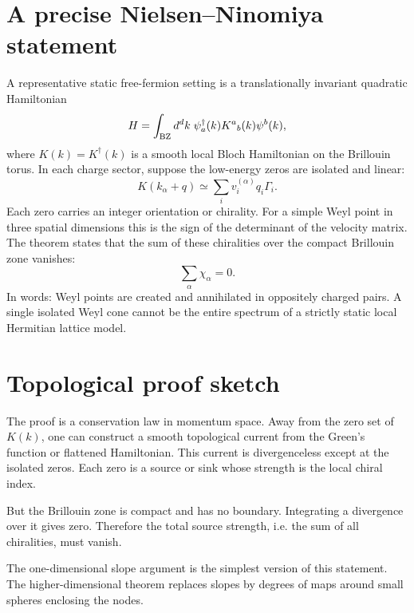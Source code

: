 \documentclass[11pt]{article}
\begin{document}
\section{A precise Nielsen--Ninomiya statement}
A representative static free-fermion setting is a translationally invariant quadratic Hamiltonian
\begin{equation}
  H=\int_{\rm BZ} d^d k\; \psi_a^\dagger(k)K^a{}_b(k)\psi^b(k),
\end{equation}
where $K(k)=K^\dagger(k)$ is a smooth local Bloch Hamiltonian on the Brillouin torus. In each charge sector, suppose the low-energy zeros are isolated and linear:
\begin{equation}
  K(k_\alpha+q)\simeq \sum_i v_i^{(\alpha)}q_i\Gamma_i.
\end{equation}
Each zero carries an integer orientation or chirality. For a simple Weyl point in three spatial dimensions this is the sign of the determinant of the velocity matrix. The theorem states that the sum of these chiralities over the compact Brillouin zone vanishes:
\begin{equation}
  \sum_\alpha \chi_\alpha=0.
\end{equation}
In words: Weyl points are created and annihilated in oppositely charged pairs. A single isolated Weyl cone cannot be the entire spectrum of a strictly static local Hermitian lattice model.

\section{Topological proof sketch}
The proof is a conservation law in momentum space. Away from the zero set of $K(k)$, one can construct a smooth topological current from the Green's function or flattened Hamiltonian. This current is divergenceless except at the isolated zeros. Each zero is a source or sink whose strength is the local chiral index.

But the Brillouin zone is compact and has no boundary. Integrating a divergence over it gives zero. Therefore the total source strength, i.e. the sum of all chiralities, must vanish.

The one-dimensional slope argument is the simplest version of this statement. The higher-dimensional theorem replaces slopes by degrees of maps around small spheres enclosing the nodes.
\end{document}
